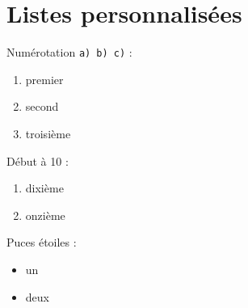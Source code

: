 \documentclass{article}
\begin{document}
\hsize=380pt
\section{Listes personnalis\'ees}
Num\'erotation \texttt{a) b) c)} :
\begin{enumerate}[label=\alph*)]
\item premier \item second \item troisi\`eme
\end{enumerate}
D\'ebut \`a 10 :
\begin{enumerate}[start=10]
\item dixi\`eme \item onzi\`eme
\end{enumerate}
Puces \'etoiles :
\begin{itemize}[label=$\star$]
\item un \item deux
\end{itemize}
\end{document}

